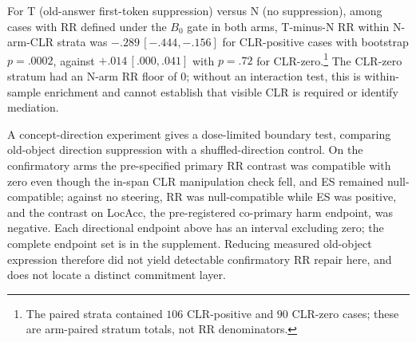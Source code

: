 \documentclass[letterpaper]{article} %
\begin{document}
For T (old-answer first-token suppression) versus N (no suppression), among cases with RR defined under the \(B_0\) gate in both arms, T-minus-N RR within N-arm-CLR strata was \(-.289\,[-.444,-.156]\) for CLR-positive cases with bootstrap \(p=.0002\), against \(+.014\,[.000,.041]\) with \(p=.72\) for CLR-zero.\footnote{The paired strata contained \(106\) CLR-positive and \(90\) CLR-zero cases; these are arm-paired stratum totals, not RR denominators.} %
The CLR-zero stratum had an N-arm RR floor of \(0\); without an interaction test, this is within-sample enrichment and cannot establish that visible CLR is required or identify mediation. %

A concept-direction experiment gives a dose-limited boundary test, comparing old-object direction suppression with a shuffled-direction control.  On the confirmatory arms the pre-specified primary RR contrast was compatible with zero even though the in-span CLR manipulation check fell, and ES remained null-compatible; against no steering, RR was null-compatible while ES was positive, and the contrast on LocAcc, the pre-registered co-primary harm endpoint, was negative.  Each directional endpoint above has an interval excluding zero; the complete endpoint set is in the supplement.  Reducing measured old-object expression therefore did not yield detectable confirmatory RR repair here, and does not locate a distinct commitment layer.
\end{document}
